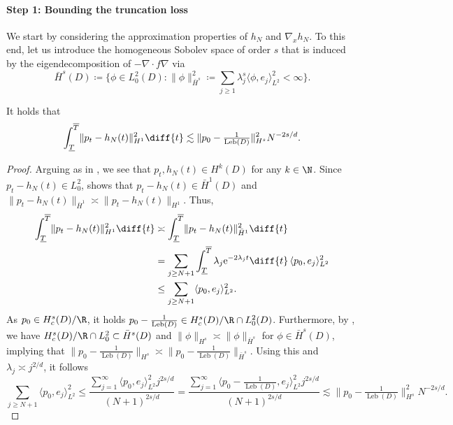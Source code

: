 \documentclass[a4paper, 11pt, headings = small, abstract]{scrartcl}
\begin{document}
\paragraph{Step 1: Bounding the truncation loss}
We start by considering the approximation properties of $h_N$ and $\nabla_x h_N$. To this end, let us introduce the homogeneous Sobolev space of order $s$ that is induced by the eigendecomposition of $-\nabla \cdot f\nabla$ via
\[\bar{H}^s(D) \coloneqq \big\{\phi \in L^2_0(D): \lVert \phi \rVert_{\bar{H}^s}^2 \coloneqq \sum_{j \geq 1} \lambda_j^s \langle \phi, e_j \rangle^2_{L^2} < \infty \big\}.\]

\begin{lemma}\label{lem:bound31}
It holds that
\[\int_{\underline{T}}^{\overline{T}} \lVert p_t - h_N(t) \rVert_{H^1}^2 \diff{t} \lesssim \lVert p_0 - \tfrac{1}{\operatorname{Leb}(D)}\rVert_{H^s}^2 N^{-2s/d}.\]
\end{lemma}
\begin{proof} 
Arguing as in \cite[Proposition 3]{nickl23}, we see that $p_t,h_N(t) \in H^k(D)$ for any $k \in \N$. 
Since $p_t-h_N(t) \in L^2_0$, \cite[Proposition 2]{nickl23} shows that $p_t - h_N(t) \in \bar{H}^1(D)$ and $\lVert p_t - h_N(t) \rVert_{\bar{H}^1} \asymp \lVert p_t - h_N(t) \rVert_{H^1}$. Thus, 
\begin{align*} 
\int_{\underline{T}}^{\overline{T}} \lVert p_t - h_N(t) \rVert_{H^1}^2 \diff{t} 
&\asymp \int_{\underline{T}}^{\overline{T}} \lVert p_t - h_N(t) \rVert_{\bar{H}^1}^2 \diff{t} \\ 
&= \sum_{j \geq N+1} \int_{\underline{T}}^{\overline{T}} \lambda_j \mathrm{e}^{-2\lambda_j t} \diff{t} \, \langle p_0, e_j \rangle^2_{L^2} \\
&\leq \sum_{j \geq N+1} \langle p_0, e_j \rangle^2_{L^2}.
\end{align*}
As $p_0 \in H^s_c(D)/\R$, it holds $p_0-\tfrac{1}{\operatorname{Leb}(D)} \in H^s_c(D)\slash \R \cap L^2_0(D)$. 
Furthermore, by \cite[Proposition 2]{nickl23}, we have $H^s_c(D)\slash \R \cap L^2_0 \subset \bar{H}^s(D)$ and $\lVert \phi \rVert_{H^s} \asymp \lVert \phi \rVert_{\bar{H}^s}$ for $\phi \in \bar{H}^s(D)$, implying that $\lVert p_0 - \tfrac{1}{\operatorname{Leb}(D)} \rVert_{H^s} \asymp \lVert p_0 -\tfrac{1}{\operatorname{Leb}(D)}\rVert_{\bar{H}^s}$. 
Using this and $\lambda_j \asymp j^{2/d}$, it follows
\begin{equation}\label{eq:markov_spectral}
\sum_{j \geq N+1} \langle p_0, e_j \rangle_{L^2}^2 \leq \frac{\sum_{j = 1}^{\infty} \langle p_0,e_j \rangle^2_{L^2} j^{2s/d}}{(N + 1)^{2s/d}} = \frac{\sum_{j = 1}^{\infty} \langle p_0 - \tfrac{1}{\operatorname{Leb}(D)},e_j \rangle^2_{L^2} j^{2s/d}}{(N + 1)^{2s/d}} \lesssim \lVert p_0 - \tfrac{1}{\operatorname{Leb}(D)}\rVert_{H^s}^2 N^{-2s/d}.
\end{equation}
\end{proof}
\end{document}

